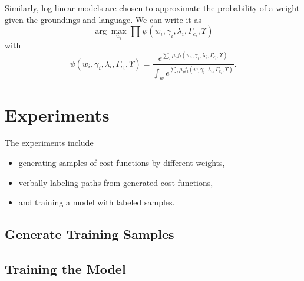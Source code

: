 \documentclass[10pt,a4paper]{article}
\begin{document}
Similarly, log-linear models are chosen to approximate the probability of a weight given the groundings and language.
We can write it as
\begin{equation}
\arg \max_{ w_i } \prod \psi ( w_i , \gamma_i , \lambda_i, \Gamma_{c_i} , \Upsilon )
\end{equation}
with
\begin{equation}
\psi ( w_i , \gamma_i , \lambda_i, \Gamma_{c_i} , \Upsilon ) = 
\frac{ e^{ \sum_{l} \mu_l f_l ( w_i, \gamma_i , \lambda_i , \Gamma_{c_i} , \Upsilon ) } }{ \int_{ w } e^{ \sum_{l} \mu_l f_l ( w, \gamma_i , \lambda_i , \Gamma_{c_i} , \Upsilon ) } } .
\end{equation}

\section{Experiments}

The experiments include
\begin{itemize}
	\item generating samples of cost functions by different weights, 
	\item verbally labeling paths from generated cost functions,
	\item and training a model with labeled samples.
\end{itemize}

\subsection{Generate Training Samples}



\subsection{Training the Model}



 	

	
\end{document}
